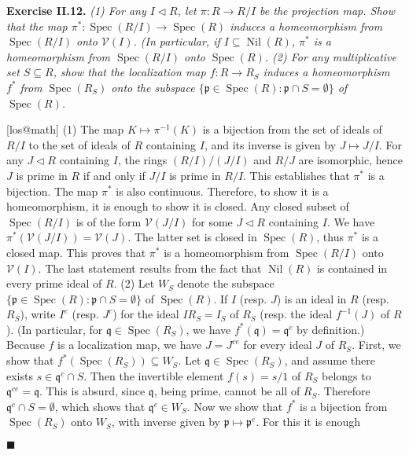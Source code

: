\documentclass{article}
\makeatletter
\newcommand\<{\triangleleft}
\DeclareMathOperator{\nil}{Nil}
\newcommand\p{\mathfrak{p}}
\newcommand\q{\mathfrak{q}}
\DeclareMathOperator{\spec}{Spec}
\newcommand{\V}{\mathcal{V}}
\newenvironment{exercise}[1]{\gdef\currentEx{#1}\begin{trivlist}\item[]%
                \textbf{Exercise #1.} \it}{\end{trivlist}}
\newenvironment{solution}[1]{\def\x{#1}\begin{trivlist}\item[]\hspace*{-.5em}[\x]}
                {\hspace*{\fill} $\blacksquare$
                \protected@write0{}{\currentEx, \x}
                \end{trivlist}}
\makeatother
\begin{document}
 \begin{exercise}{II.12}
   (1) For any $I\<R$, let $\pi: R \rightarrow R/I$ be the
   projection map. Show that the map $\pi^*: \spec(R/I) \rightarrow \spec(R)$
   induces a homeomorphism from $\spec(R/I)$ onto $\V(I)$. (In particular,
   if $I \subseteq \nil(R)$, $\pi^*$ is a homeomorphism from $\spec(R/I)$
   onto $\spec(R)$. \newline
   (2) For any multiplicative set $S \subseteq R$, show that the localization
   map $f: R \rightarrow R_S$ induces a homeomorphism $f^*$ from $\spec(R_S)$
   onto the subspace $\{\p \in \spec(R): \p \cap S = \emptyset \}$ of
   $\spec(R)$.
 \end{exercise}
 \begin{solution}{los@math}
   (1) The map $K \mapsto \pi^{-1}(K)$ is a bijection from the set of ideals
   of $R/I$ to the set of ideals of $R$ containing $I$, and its inverse is
   given by $J \mapsto J/I$. For any $J \< R$ containing $I$, the rings
   $(R/I)/(J/I)$ and $R/J$ are isomorphic, hence $J$ is prime in $R$
   if and only if $J/I$ is prime in $R/I$. This establishes that $\pi^*$
   is a bijection. The map $\pi^*$ is also continuous. Therefore, to show it is a
   homeomorphism, it is enough to show it is closed. Any closed subset of
   $\spec(R/I)$ is of the form $\V(J/I)$ for some $J \< R$ containing $I$.
   We have $\pi^*(\V(J/I))=\V(J)$. The latter set is closed in $\spec(R)$,
   thus $\pi^*$ is a closed map. This proves that $\pi^*$ is a
   homeomorphism from $\spec(R/I)$ onto $\V(I)$. The last statement results
   from the fact that $\nil(R)$ is contained in every prime ideal of $R$.
   \newline
   (2) Let $W_S$ denote the subspace $\{\p \in \spec(R): \p \cap S =
   \emptyset \}$ of $\spec(R)$. If $I$ (resp. $J$) is an ideal in $R$
   (resp. $R_S$), write $I^e$ (resp. $J^c$) for the ideal $IR_S=I_S$
   of $R_S$ (resp. the ideal $f^{-1}(J)$ of $R$). (In particular,
   for $\q \in \spec(R_S)$, we have $f^*(\q) = \q^c$ by definition.)
   Because $f$ is a localization map, we have $J = J^{ce}$ for every
   ideal $J$ of $R_S$.
   First, we show that $f^*(\spec(R_S)) \subseteq W_S$. Let $\q \in
   \spec(R_S)$, and assume there exists $s \in \q^c \cap S$.  Then
   the invertible element $f(s)=s/1$ of $R_S$ belongs to $\q^{ce} = \q$.
   This is absurd, since $\q$, being prime, cannot be all of $R_S$.
   Therefore $\q^c \cap S = \emptyset$, which shows that $\q^c \in W_S$.
   Now we show that $f^*$ is a bijection from $\spec(R_S)$ onto
   $W_S$, with inverse given by $\p \mapsto \p^e$. For this it is enough

\end{solution}
\end{document}
